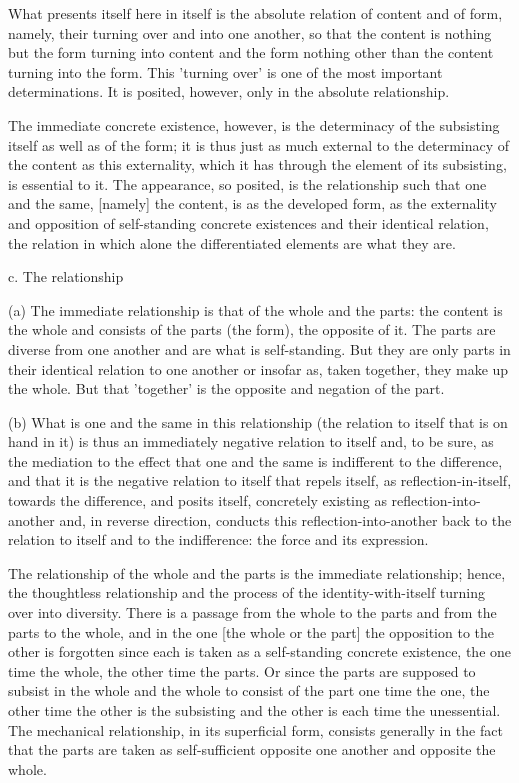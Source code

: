    What presents itself here in itself is
    the absolute relation of content and of form, namely,
    their turning over and into one another,
    so that the content is nothing but the form turning into content
    and the form nothing other than the content turning into the form.
    This 'turning over' is one of the most important determinations.
    It is posited, however, only in the absolute relationship.

The immediate concrete existence, however, is
the determinacy of the subsisting itself as well as of the form;
it is thus just as much external to the determinacy of the content
as this externality, which it has through the element of its subsisting,
is essential to it.
The appearance, so posited, is the relationship
such that one and the same, [namely] the content, is
as the developed form, as the externality and opposition of
self-standing concrete existences and their identical relation,
the relation in which alone the differentiated elements are what they are.

c. The relationship

(a) The immediate relationship is that of the whole and the parts:
the content is the whole and consists of the parts (the form),
the opposite of it.
The parts are diverse from one another
and are what is self-standing.
But they are only parts in their identical relation to one another
or insofar as, taken together, they make up the whole.
But that 'together' is the opposite and negation of the part.

(b) What is one and the same in this relationship
(the relation to itself that is on hand in it)
is thus an immediately negative relation to itself and,
to be sure, as the mediation to the effect that one and the same
is indifferent to the difference, and that
it is the negative relation to itself that repels itself,
as reflection-in-itself, towards the difference, and posits itself,
concretely existing as reflection-into-another and, in reverse direction,
conducts this reflection-into-another back to
the relation to itself and to the indifference:
the force and its expression.

    The relationship of the whole and the parts is
    the immediate relationship;
    hence, the thoughtless relationship
    and the process of the identity-with-itself
    turning over into diversity.
    There is a passage from the whole to the parts and
    from the parts to the whole,
    and in the one [the whole or the part]
    the opposition to the other is forgotten since
    each is taken as a self-standing concrete existence,
    the one time the whole, the other time the parts.
    Or since the parts are supposed to subsist in the whole
    and the whole to consist of the part one time the one,
    the other time the other is the subsisting and
    the other is each time the unessential.
    The mechanical relationship,
    in its superficial form,
    consists generally in the fact
    that the parts are taken as self-sufficient
    opposite one another and opposite the whole.

